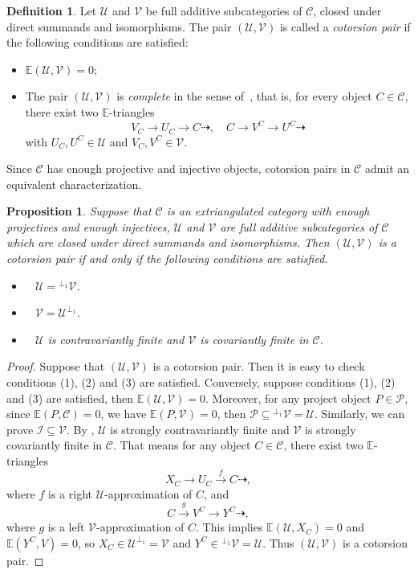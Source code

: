 \documentclass[a4paper,reqno,11pt]{amsart}
\newtheorem{proposition}[theorem]{Proposition}
\theoremstyle{definition}
\newtheorem{definition}[theorem]{Definition}
\def\C{\mathcal{C}}
\def\U{\mathcal{U}}
\def\V{\mathcal{V}}
\def\I{\mathcal {I}}
\def\P{\mathcal {P}}
\def\E{\mathbb{E}}
\begin{document}
\begin{definition}\cite[Definition 4.1]{NP}
Let $\mathcal{U}$ and $\mathcal{V}$ be full additive subcategories of $\mathcal{C}$, closed under direct summands and isomorphisms. The pair $(\mathcal{U}, \mathcal{V})$ is called a \emph{cotorsion pair} if the following conditions are satisfied:
\begin{itemize}
  \item[(a)] $\mathbb{E}(\mathcal{U}, \mathcal{V}) = 0$;
  \item[(b)] The pair $(\mathcal{U}, \mathcal{V})$ is \emph{complete} in the sense of~\cite{H}, that is, for every object $C \in \mathcal{C}$, there exist two $\E$-triangles
  \[
  V_C \to U_C \to C\dashrightarrow,\quad C\to V^C \to U^C\dashrightarrow
  \]
  with $U_C, U^C \in \mathcal{U}$ and $V_C, V^C \in \mathcal{V}$.
\end{itemize}
\end{definition}

Since $\mathcal{C}$ has enough projective and injective objects, cotorsion pairs in $\mathcal{C}$ admit an equivalent characterization.
















\begin{proposition}\label{1}
Suppose that $\C$ is an extriangulated category with enough projectives and enough injectives, $\U$ and $\V$ are full additive subcategories of $\C$ which are closed under direct summands and isomorphisms. Then $(\U, \V)$ is a cotorsion pair if and only if the following conditions are satisfied.
\begin{itemize}
  \item [\rm (1)]~ $\U={^{\perp_1}\V}$.
  \item [\rm (2)]~ $\V=\U^{\perp_1}$.
  \item [\rm (3)]~ $\U$ is contravariantly finite and $\V$ is covariantly finite in $\C$.
\end{itemize}
\end{proposition}
\begin{proof}
Suppose that $(\U, \V)$ is a cotorsion pair. Then it is easy to check conditions (1), (2) and (3) are satisfied. Conversely, suppose conditions (1), (2) and (3) are satisfied, then $\E(\U, \V) =0$. Moreover, for any project object $P\in\P$, since $\E(P,\C)=0$, we have $\E(P,\V)=0$, then $\P\subseteq{^{\perp_1}\V}=\U$. Similarly, we can prove $\I\subseteq\V$. By \cite[Remark 3.20]{ZZ1}, $\U$ is strongly contravariantly finite and $\V$ is strongly covariantly finite in $\C$. That means for any object $C\in\C$, there exist two $\mathbb{E}$-triangles
  $$X_C\rightarrow U_C\overset{f}\rightarrow C\dashrightarrow,$$
where $f$ is a right $\U$-approximation of $C$, and
$$C\overset{g}\rightarrow V^C\rightarrow Y^C\dashrightarrow,$$
where $g$ is a left $\V$-approximation of $C$. This implies $\E(\U,X_C)=0$ and $\E(Y^C,V)=0$, so $X_C\in\U^{\perp_1}=\V$ and $Y^C\in{^{\perp_1}\V}=\U$. Thus $(\U, \V)$ is a cotorsion pair.
\end{proof}
\end{document}
